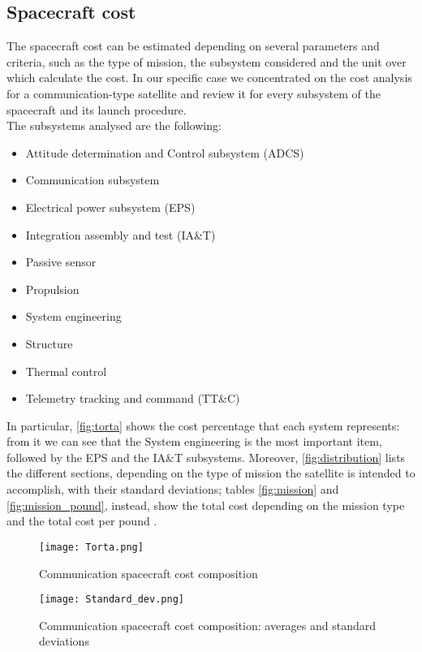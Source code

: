 \subsection{Spacecraft cost}
	The spacecraft cost can be estimated depending on several parameters and criteria, such as the type of mission, the subsystem considered and the unit over which calculate the cost. In our specific case we concentrated on the cost analysis for a communication-type satellite and review it for every subsystem of the spacecraft and its launch procedure.\\

	The subsystems analysed  are the following:
	\begin{itemize}
		\item Attitude determination and Control subsystem (ADCS)
		\item Communication subsystem
		\item Electrical power subsystem (EPS)
		\item Integration assembly and test (IA\&T)
		\item Passive sensor
		\item Propulsion
		\item System engineering
		\item Structure
		\item Thermal control
		\item Telemetry tracking and command (TT\&C)
	\end{itemize}
	In particular, \autoref{fig:torta} shows the cost percentage that each system represents: from it we can see that the 				System engineering is the most important item, followed by the EPS and the IA\&T subsystems. Moreover, 						\autoref{fig:distribution} lists the different sections, depending on the type of mission the satellite is intended to 					accomplish, with their standard deviations; tables \ref{fig:mission} and \ref{fig:mission_pound}, instead, show the total cost depending on the mission type and the total cost per pound \cite{Fox2008}.

	\begin{figure}
		\centering
		\texttt{[image: Torta.png]}
		\caption{Communication spacecraft cost composition}
		\label{fig:torta}
	\end{figure}

	\begin{figure}
		\centering
		\texttt{[image: Standard\_dev.png]}
		\caption{Communication spacecraft cost composition: averages and standard deviations}
		\label{fig:distribution}
	\end{figure}

